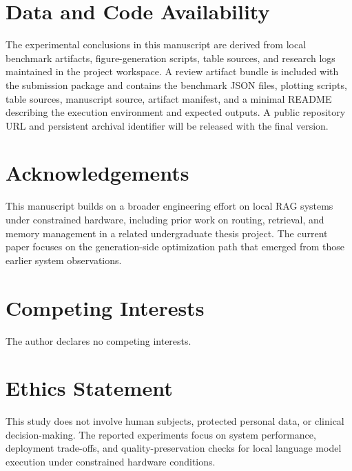\documentclass[10pt,twocolumn]{article}
\newif\ifanonymized
\begin{document}
\section*{Data and Code Availability}

The experimental conclusions in this manuscript are derived from local benchmark artifacts, figure-generation scripts, table sources, and research logs maintained in the project workspace. A review artifact bundle is included with the submission package and contains the benchmark JSON files, plotting scripts, table sources, manuscript source, artifact manifest, and a minimal README describing the execution environment and expected outputs. A public repository URL and persistent archival identifier will be released with the final version.

\section*{Acknowledgements}

\ifanonymized
Acknowledgements are omitted during anonymous review and will be restored in the camera-ready or non-anonymous submission version.
\else
This manuscript builds on a broader engineering effort on local RAG systems under constrained hardware, including prior work on routing, retrieval, and memory management in a related undergraduate thesis project. The current paper focuses on the generation-side optimization path that emerged from those earlier system observations.
\fi

\section*{Competing Interests}

The author declares no competing interests.

\section*{Ethics Statement}

This study does not involve human subjects, protected personal data, or clinical decision-making. The reported experiments focus on system performance, deployment trade-offs, and quality-preservation checks for local language model execution under constrained hardware conditions.



\end{document}
